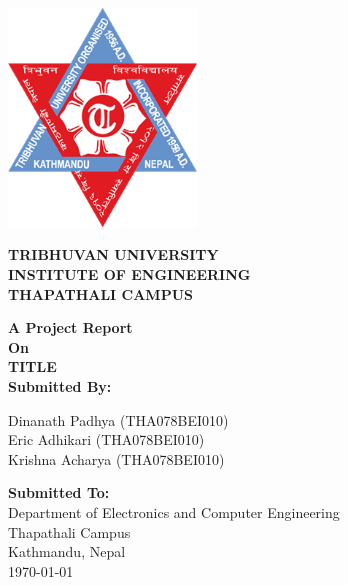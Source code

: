 \begin{titlepage}
    \noindent
    \begin{center}
        \includegraphics[width=5cm]{img/logo.png}

        {\fontsize{12}{14.4} \bfseries \centering TRIBHUVAN UNIVERSITY \\ INSTITUTE OF ENGINEERING \\ THAPATHALI CAMPUS \\ }

        \vspace{1.5cm}
        {\bfseries A Project Report \\ On \\ TITLE \linebreak[5] \\ Submitted By: \\ }

        Dinanath Padhya (THA078BEI010) \\
        Eric Adhikari (THA078BEI010) \\
        Krishna Acharya (THA078BEI010) \linebreak[4]

        {\bfseries Submitted To:} \\
        Department of Electronics and Computer Engineering \\
        Thapathali Campus \\
        Kathmandu, Nepal \linebreak[5] \\
        \today \\
    \end{center}
\end{titlepage}

